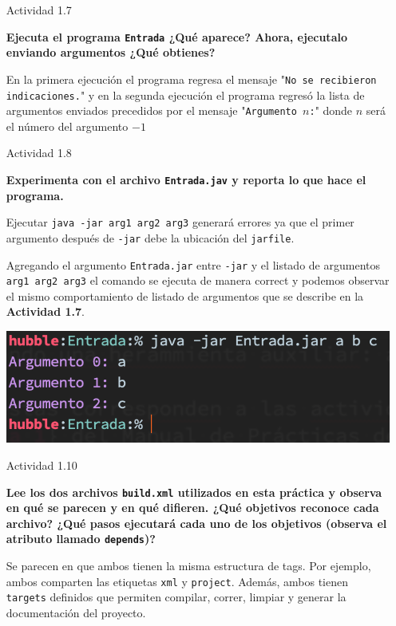 \documentclass[11pt,letterpaper]{article}
\begin{document}
\begin{enumerate}
    \item [Actividad 1.7] {\bfseries Ejecuta el programa \texttt{Entrada}
    ¿Qué aparece? Ahora, ejecutalo enviando argumentos ¿Qué obtienes?\par}

        En la primera ejecución el programa regresa el mensaje
        "\texttt{No se recibieron indicaciones.}" y en la segunda ejecución
        el programa regresó la lista de argumentos enviados precedidos por el
        mensaje "\texttt{Argumento $n$:}" donde $n$ será el número del argumento $-1$

    \item [Actividad 1.8] {\bfseries Experimenta con el archivo \texttt{Entrada.jav} y
    reporta lo que hace el programa.\par}

        Ejecutar \texttt{java -jar arg1 arg2 arg3} generará errores ya que el primer
        argumento después de \texttt{-jar} debe la ubicación del \texttt{jarfile}.

        Agregando el argumento \texttt{Entrada.jar} entre \texttt{-jar} y el listado
        de argumentos \texttt{arg1 arg2 arg3} el comando se ejecuta de manera correct
        y podemos observar el mismo comportamiento de listado de argumentos que se
        describe en la \textbf{Actividad 1.7}.

        \begin{center}
            \includegraphics[scale=.5]{assets/img/1-8.png}
        \end{center}

    \item [Actividad 1.10] {\bfseries Lee los dos archivos \texttt{build.xml}
    utilizados en esta práctica y observa en qué se parecen y en qué difieren.
    ¿Qué objetivos reconoce cada archivo? ¿Qué pasos ejecutará cada uno de los
    objetivos (observa el atributo llamado \texttt{depends})?\par}

        Se parecen en que ambos tienen la misma estructura de tags.
        Por ejemplo, ambos comparten las etiquetas \texttt{xml} y \texttt{project}.
        Además, ambos tienen \texttt{targets} definidos que permiten compilar,
        correr, limpiar y generar la documentación del proyecto.


\end{enumerate}
\end{document}
